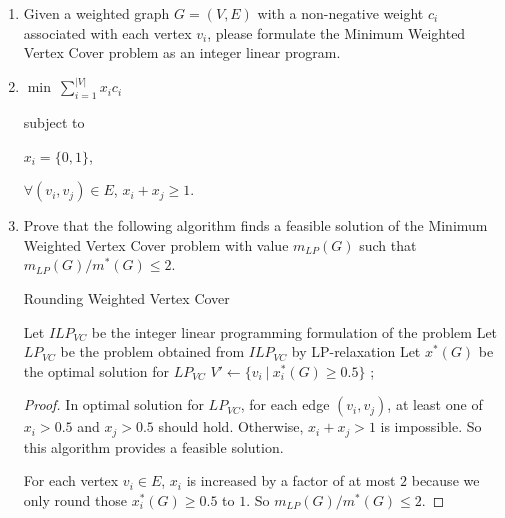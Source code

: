 \documentclass[12pt,a4paper]{article}
\makeatletter
\newtheorem*{solution}{Solution}
\theoremstyle{definition}
\renewenvironment{solution}[1][Solution] {\par\pushQED{\qed}\normalfont\topsep6\p@\@plus6\p@\relax\trivlist\item[\hskip\labelsep\bfseries#1\@addpunct{.}]\ignorespaces}{\popQED\endtrivlist\@endpefalse} \makeatother
\makeatother
\begin{document}
\begin{enumerate}
\begin{enumerate}
\item
Given a weighted graph $G=(V, E)$ with a non-negative weight $c_i$ associated with each vertex $v_i$, please formulate the Minimum Weighted Vertex Cover problem as an integer linear program.

\begin{solution}\quad

  $\min~\sum\limits_{i=1}^{|V|} x_ic_i$

  subject to
  
  \quad$x_i = \{0,1\}$,

  \quad$\forall (v_i, v_j)\in E$, $x_i + x_j \geq 1$.
\end{solution}

\item
Prove that the following algorithm finds a feasible solution of the Minimum Weighted Vertex Cover problem with value $m_{LP}(G)$ such that $m_{LP}(G)/m^*(G) \leq 2$.

\begin{minipage}{0.8\textwidth}
\centering
\begin{algorithm}[H]
\caption{Rounding Weighted Vertex Cover}
\BlankLine
Let $ILP_{VC}$ be the integer linear programming formulation of the problem\;
Let $LP_{VC}$ be the problem obtained from $ILP_{VC}$ by LP-relaxation\;
Let $x^*(G)$ be the optimal solution for $LP_{VC}$\;
$V' \leftarrow \{v_i \ | \ x_i^*(G) \geq 0.5\}$\;
;
\end{algorithm}
\end{minipage}

\begin{proof}
  In optimal solution for $LP_{VC}$, for each edge $(v_i,v_j)$, at least one of $x_i > 0.5$ and $x_j > 0.5$ should hold. Otherwise, $x_i + x_j > 1$ is impossible. So this algorithm provides a feasible solution.

  For each vertex $v_i\in E$, $x_i$ is increased by a factor of at most $2$ because we only round those $x_i^*(G) \geq 0.5$ to $1$. So $m_{LP}(G)/m^*(G) \leq 2$.
\end{proof}

\end{enumerate}

\end{enumerate}

\vspace{20pt}

\end{document}
